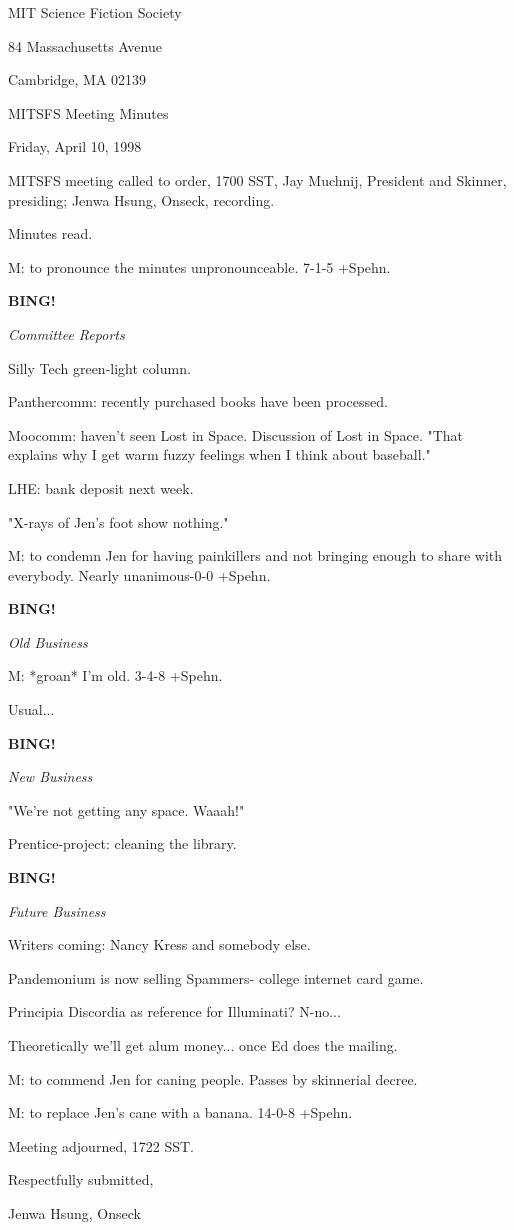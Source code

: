 \documentclass[12pt]{article}
\newcommand{\bing}{{\bf BING!} }
\newcommand{\goto}[1]{\bing \vskip 12pt \centerline{{\em{#1}}}}
\begin{document}
\begin{center}

MIT Science Fiction Society 

84 Massachusetts Avenue

Cambridge, MA 02139

\vspace{12pt}

MITSFS Meeting Minutes 

Friday, April 10, 1998

\end{center}
 
\vspace{18pt}

\setlength{\parskip}{6pt}

\noindent
MITSFS meeting called to order, 1700 SST,
Jay Muchnij, President and Skinner, presiding; Jenwa Hsung, Onseck, recording.

Minutes read.

M: to pronounce the minutes unpronounceable. 7-1-5 +Spehn.

\goto{Committee Reports}

Silly Tech green-light column.

Panthercomm: recently purchased books have been processed.

Moocomm: haven't seen Lost in Space. Discussion of Lost in Space. "That explains why I get warm fuzzy feelings when I think about baseball."

LHE: bank deposit next week.

"X-rays of Jen's foot show nothing."

M: to condemn Jen for having painkillers and not bringing enough to share with everybody. Nearly unanimous-0-0 +Spehn.

\goto{Old Business}

M: *groan* I'm old. 3-4-8 +Spehn.

Usual...

\goto{New Business}

"We're not getting any space. Waaah!"

Prentice-project: cleaning the library.

\goto{Future Business}

Writers coming: Nancy Kress and somebody else.

Pandemonium is now selling Spammers- college internet card game.

Principia Discordia as reference for Illuminati? N-no...

Theoretically we'll get alum money... once Ed does the mailing.

M: to commend Jen for caning people. Passes by skinnerial decree.

M: to replace Jen's cane with a banana. 14-0-8 +Spehn.

\vspace{12pt}

\noindent
Meeting adjourned, 1722 SST.

\vspace{18pt}

\centerline{Respectfully submitted,}
\centerline{Jenwa Hsung, Onseck}
\end{document}
